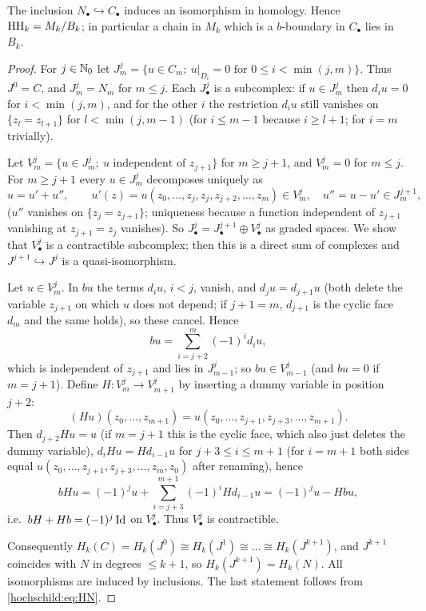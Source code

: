 \begin{proposition}\label{hochschild:prop:normalized}
The inclusion $N_\bullet\hookrightarrow C_\bullet$ induces an isomorphism in
homology. Hence $\operatorname{HH}_k=M_k/B_k$; in particular a chain in $M_k$ which is a
$b$-boundary in $C_\bullet$ lies in $B_k$.
\end{proposition}
\begin{proof}
For $j\in\mathbb{N}_0$ let $J^j_m=\{u\in C_m;\ u|_{D_i}=0\text{ for }0\le i<\min(j,m)\}$.
Thus $J^0=C$, and $J^j_m=N_m$ for $m\le j$. Each $J^j_\bullet$ is a
subcomplex: if $u\in J^j_m$ then $d_iu=0$ for $i<\min(j,m)$, and for the other
$i$ the restriction $d_iu$ still vanishes on $\{z_l=z_{l+1}\}$ for
$l<\min(j,m-1)$ (for $i\le m-1$ because $i\ge l+1$; for $i=m$ trivially).

Let $V^j_m=\{u\in J^j_m;\ u\text{ independent of }z_{j+1}\}$ for $m\ge j+1$,
and $V^j_m=0$ for $m\le j$. For $m\ge j+1$ every $u\in J^j_m$ decomposes
uniquely as
\begin{equation*}
  u=u'+u'',\qquad u'(z)=u(z_0,\dots,z_j,z_j,z_{j+2},\dots,z_m)\in V^j_m,\quad
  u''=u-u'\in J^{j+1}_m,
\end{equation*}
($u''$ vanishes on $\{z_j=z_{j+1}\}$; uniqueness because a function
independent of $z_{j+1}$ vanishing at $z_{j+1}=z_j$ vanishes). So
$J^j_\bullet=J^{j+1}_\bullet\oplus V^j_\bullet$ as graded spaces. We show that
$V^j_\bullet$ is a contractible subcomplex; then this is a direct sum of
complexes and $J^{j+1}\hookrightarrow J^j$ is a quasi-isomorphism.

Let $u\in V^j_m$. In $bu$ the terms $d_iu$, $i<j$, vanish, and
$d_ju=d_{j+1}u$ (both delete the variable $z_{j+1}$ on which $u$ does not
depend; if $j+1=m$, $d_{j+1}$ is the cyclic face $d_m$ and the same holds), so
these cancel. Hence
\begin{equation*}
  bu=\sum_{i=j+2}^m(-1)^id_iu,
\end{equation*}
which is independent of $z_{j+1}$ and lies in $J^j_{m-1}$; so $bu\in
V^j_{m-1}$ (and $bu=0$ if $m=j+1$). Define $H:V^j_m\to V^j_{m+1}$ by inserting
a dummy variable in position $j+2$:
\begin{equation*}
  (Hu)(z_0,\dots,z_{m+1})=u(z_0,\dots,z_{j+1},z_{j+3},\dots,z_{m+1}).
\end{equation*}
Then $d_{j+2}Hu=u$ (if $m=j+1$ this is the cyclic face, which also just
deletes the dummy variable), $d_iHu=Hd_{i-1}u$ for $j+3\le i\le m+1$ (for
$i=m+1$ both sides equal $u(z_0,\dots,z_{j+1},z_{j+3},\dots,z_m,z_0)$ after
renaming), hence
\begin{equation*}
  bHu=(-1)^ju+\sum_{i=j+3}^{m+1}(-1)^iHd_{i-1}u=(-1)^ju-Hbu,
\end{equation*}
i.e.\ $bH+Hb=(-1)^j\operatorname{Id}$ on $V^j_\bullet$. Thus $V^j_\bullet$ is contractible.

Consequently $H_k(C)=H_k(J^0)\cong H_k(J^1)\cong\dots\cong H_k(J^{k+1})$, and
$J^{k+1}$ coincides with $N$ in degrees $\le k+1$, so $H_k(J^{k+1})=H_k(N)$.
All isomorphisms are induced by inclusions. The last statement follows from
\eqref{hochschild:eq:HN}.
\end{proof}

